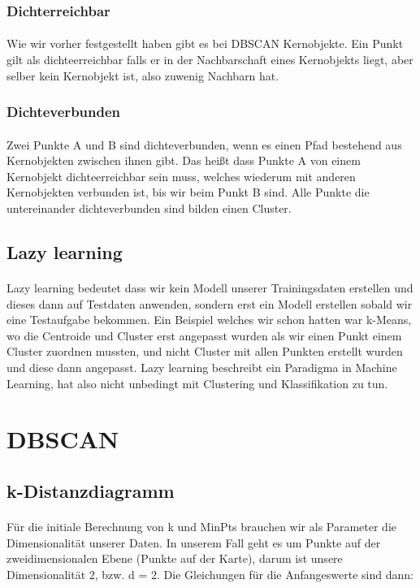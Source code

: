 \documentclass[a4paper]{article}
\begin{document}
\subsubsection{Dichterreichbar}
\paragraph{}
Wie wir vorher festgestellt haben gibt es bei DBSCAN Kernobjekte. Ein Punkt gilt als dichteerreichbar falls er in der Nachbarschaft eines Kernobjekts liegt, aber selber kein Kernobjekt ist, also zuwenig Nachbarn hat.
\subsubsection{Dichteverbunden}
\paragraph{}
Zwei Punkte A und B sind dichteverbunden, wenn es einen Pfad bestehend aus Kernobjekten zwischen ihnen gibt. Das heißt dass Punkte A von einem Kernobjekt dichteerreichbar sein muss, welches wiederum mit anderen Kernobjekten verbunden ist, bis wir beim Punkt B sind. Alle Punkte die untereinander dichteverbunden sind bilden einen Cluster.
\subsection{Lazy learning}
\paragraph{}
Lazy learning bedeutet dass wir kein Modell unserer Trainingsdaten erstellen und dieses dann auf Testdaten anwenden, sondern erst ein Modell erstellen sobald wir eine Testaufgabe bekommen. Ein Beispiel welches wir schon hatten war k-Means, wo die Centroide und Cluster erst angepasst wurden als wir einen Punkt einem Cluster zuordnen mussten, und nicht Cluster mit allen Punkten erstellt wurden und diese dann angepasst. Lazy learning beschreibt ein Paradigma in Machine Learning, hat also nicht unbedingt mit Clustering und Klassifikation zu tun.
\section{DBSCAN}
\subsection{k-Distanzdiagramm}
\paragraph{}
Für die initiale Berechnung von k und MinPts brauchen wir als Parameter die Dimensionalität unserer Daten. In unserem Fall geht es um Punkte auf der zweidimensionalen Ebene (Punkte auf der Karte), darum ist unsere Dimensionalität 2, bzw. d = 2. Die Gleichungen für die Anfangeswerte sind dann:
\end{document}
